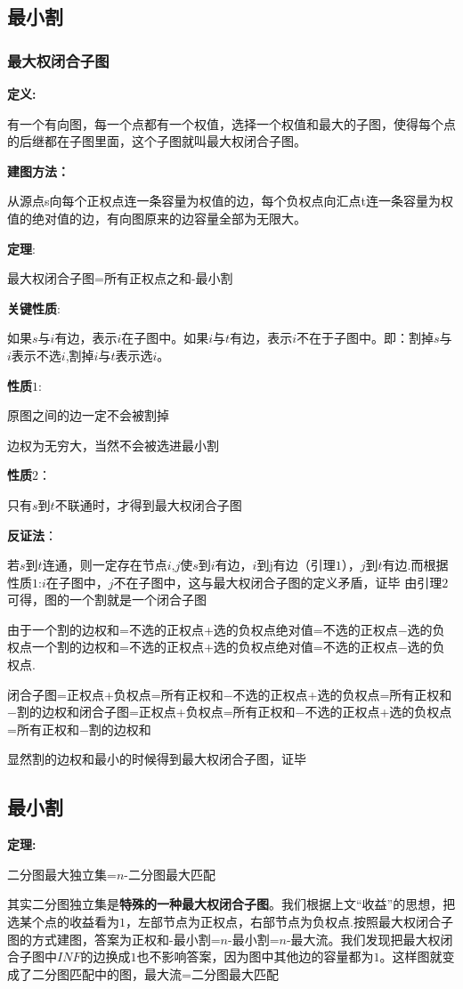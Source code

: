 \documentclass[12pt, a4paper, oneside]{ctexart}
\begin{document}
\newpage
\subsection{最小割}
\subsubsection{最大权闭合子图}
\textbf{定义:}
\par
\qquad  有一个有向图，每一个点都有一个权值，选择一个权值和最大的子图，使得每个点的后继都在子图里面，这个子图就叫最大权闭合子图。\par
\textbf{建图方法：}
\par
\qquad  从源点s向每个正权点连一条容量为权值的边，每个负权点向汇点t连一条容量为权值的绝对值的边，有向图原来的边容量全部为无限大。\par
\textbf{定理}:
\par
\qquad  最大权闭合子图=所有正权点之和-最小割\par
\textbf{关键性质}:
\par
\qquad  如果$s$与$i$有边，表示$i$在子图中。如果$i$与$t$有边，表示$i$不在于子图中。即：割掉$s$与$i$表示不选$i$,割掉$i$与$t$表示选$i$。\par
\textbf{性质$1$}:
\par
\qquad  原图之间的边一定不会被割掉\par
 边权为无穷大，当然不会被选进最小割\par
\textbf{性质$2$}：
\par
\qquad  只有$s$到$t$不联通时，才得到最大权闭合子图\par
\textbf{反证法}：
\par
\qquad  若$s$到$t$连通，则一定存在节点$i$,$j$使$s$到$i$有边，$i$到j有边（引理$1$），$j$到$t$有边.而根据性质$1$:$i$在子图中，$j$不在子图中，这与最大权闭合子图的定义矛盾，证毕
由引理$2$可得，图的一个割就是一个闭合子图\par
由于一个割的边权和=不选的正权点+选的负权点绝对值=不选的正权点−选的负权点一个割的边权和=不选的正权点+选的负权点绝对值=不选的正权点−选的负权点.\par
闭合子图=正权点+负权点=所有正权和−不选的正权点+选的负权点=所有正权和−割的边权和闭合子图=正权点+负权点=所有正权和−不选的正权点+选的负权点=所有正权和−割的边权和\par
显然割的边权和最小的时候得到最大权闭合子图，证毕

\newpage
\subsection{最小割}
\textbf{定理:} \par
\qquad  二分图最大独立集=$n$-二分图最大匹配\par
\qquad  其实二分图独立集是\textbf{特殊的一种最大权闭合子图}。我们根据上文“收益”的思想，把选某个点的收益看为$1$，左部节点为正权点，右部节点为负权点.按照最大权闭合子图的方式建图，答案为正权和-最小割=$n$-最小割=$n$-最大流。我们发现把最大权闭合子图中$INF$的边换成$1$也不影响答案，因为图中其他边的容量都为$1$。这样图就变成了二分图匹配中的图，最大流=二分图最大匹配
\end{document}
